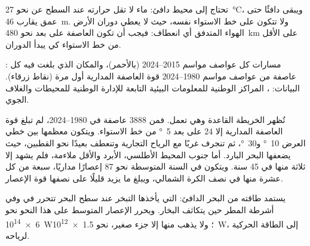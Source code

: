 تحتاج  إلى محيط دافئ: ماء لا تقل حرارته عند السطح عن نحو
\qty{27}{\degreeCelsius}، ويبقى دافئًا حتى عمق يقارب
\qty{46}{m}. ولا تتكون على خط الاستواء نفسه، حيث لا يعطي دوران الأرض الهواء
المتدفق أي انعطاف: فيجب أن تكون العاصفة على بعد نحو
\qty{480}{km} على الأقل من خط الاستواء كي يبدأ الدوران.

\begin{omfigure}

{\small {}: مسارات كل عواصف مواسم 2015--2024 (بالأحمر)، والمكان الذي
بلغت فيه كل عاصفة من عواصف مواسم 1980--2024 قوة العاصفة المدارية أول مرة (نقاط
زرقاء). البيانات: ، المراكز الوطنية للمعلومات البيئية
التابعة للإدارة الوطنية للمحيطات والغلاف الجوي.}
\end{omfigure}

تُظهر الخريطة القاعدة وهي تعمل. فمن \num{3888} عاصفة في 1980--2024، لم تبلغ قوة
العاصفة المدارية إلا 24 على بعد \qty{5}{\degree} من خط الاستواء. ويتكون معظمها بين
خطي العرض \qty{10}{\degree} و\qty{30}{\degree}، ثم تنجرف غربًا مع الرياح التجارية
وتنعطف بعيدًا نحو القطبين، حيث يضعفها البحر البارد. أما جنوب المحيط الأطلسي، الأبرد
والأقل ملاءمة، فلم يشهد إلا ثلاثة منها في 45 سنة. ويتكون في السنة المتوسطة نحو 87
إعصارًا مداريًا، سبعة من كل عشرة منها في نصف الكرة الشمالي، ويبلغ ما يزيد قليلًا
على نصفها قوة الإعصار.

\begin{proposition}\label{prop:g10:storms-and-cyclones:energy}
يستمد  طاقته من البحر الدافئ:  التي يأخذها التبخر
عند سطح البحر تتحرر في  وفي أشرطة المطر حين يتكاثف البخار. ويحرر الإعصار
المتوسط على هذا النحو نحو \qty{6e14}{W}؛ ولا يذهب منها إلا جزء صغير، نحو
\qty{1.5e12}{W}، إلى الطاقة الحركية لرياحه.
\end{proposition}

